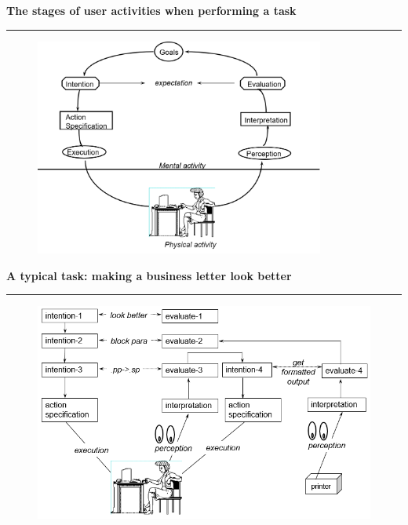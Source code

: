 \documentclass[pdf]{beamer}
\begin{document}
\begin{frame}
\vspace{8mm}
\textcolor{myBlue}{\textbf{\Large{The stages of user activities when performing a task}}}

\textcolor{red}{\rule{10cm}{1mm}}

\begin{figure} 
 	\centering
  	\hspace{10px} \includegraphics[width=0.85\textwidth]{12_Picture1.png}
\end{figure}
\end{frame}



\begin{frame} 
\vspace{8mm}
\textcolor{myBlue}{\textbf{\Large{A typical task: making a business letter look better}}}

\textcolor{red}{\rule{10cm}{1mm}}

\begin{figure} 
	\includegraphics[scale=0.5]{14_Picture1.png}
\end{figure}
\end{frame}
\end{document}
